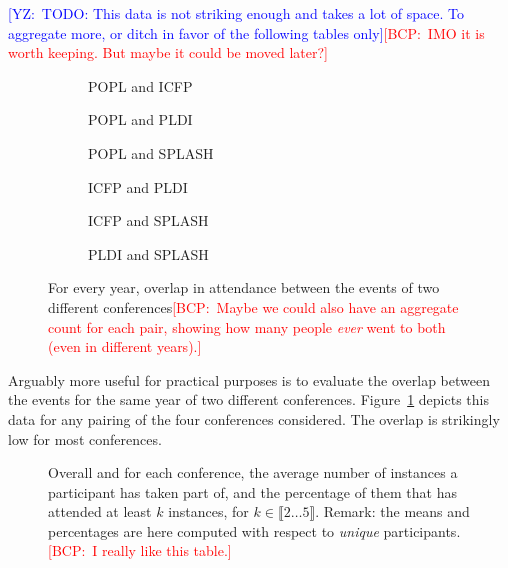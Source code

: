 \documentclass{scrartcl}
\newcommand{\yz}[1]{\textcolor{blue}{{[YZ:~#1]}}}
\newcommand{\bcp}[1]{\textcolor{red}{{[BCP:~#1]}}}
\newcommand{\yz}[1]{}
\newcommand{\bcp}[1]{}
\begin{document}
\yz{TODO: This data is not striking enough and takes a lot of space. To aggregate
  more, or ditch in favor of the following tables only}\bcp{IMO it is worth
  keeping.  But maybe it could be moved later?}

\begin{figure}
  \centering
  \begin{subfigure}[b]{0.3\textwidth}
    \centering
    \caption{POPL and ICFP}
  \end{subfigure}
  \begin{subfigure}[b]{0.3\textwidth}
    \centering
    \caption{POPL and PLDI}
  \end{subfigure}
  \begin{subfigure}[b]{0.3\textwidth}
    \centering
    \caption{POPL and SPLASH}
  \end{subfigure}
  \begin{subfigure}[b]{0.3\textwidth}
    \centering
    \caption{ICFP and PLDI}
  \end{subfigure}
  \begin{subfigure}[b]{0.3\textwidth}
    \centering
    \caption{ICFP and SPLASH}
  \end{subfigure}
  \begin{subfigure}[b]{0.3\textwidth}
    \centering
    \caption{PLDI and SPLASH}
  \end{subfigure}
   \caption{For every year, overlap in attendance between the events of two
     different conferences\bcp{Maybe we could also have an aggregate count
       for each pair, showing how many people {\em ever} went to both (even
       in different years).}}
  \label{fig:overlap-cross}
\end{figure}

Arguably more useful for practical purposes is to evaluate the overlap 
between the events for the same year of two different conferences.
Figure~\ref{fig:overlap-cross} depicts this data for any pairing of the four
conferences considered. The overlap is strikingly low for most conferences.

\begin{figure}
\caption{Overall and for each conference, the average number of instances a
  participant has taken part of, and the percentage of them that has
  attended at least $k$ instances, for $k\in\llbracket 2 \dots 5
  \rrbracket$. Remark: the means and percentages are here computed with
  respect to \emph{unique} participants.  \bcp{I really like this table.}}
\label{fig:reccurent}
\end{figure}
\end{document}
